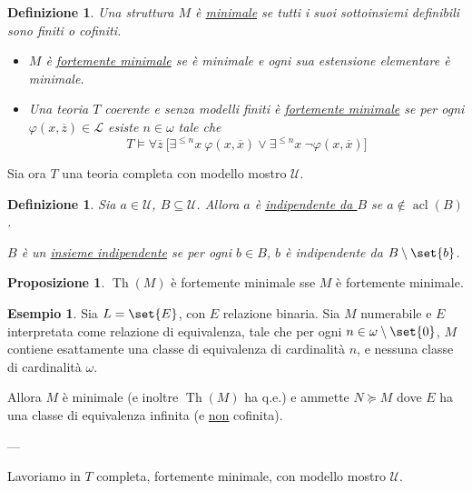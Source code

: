 \documentclass[10pt]{article}
\newcommand{\1}{\mathds{1}}
\theoremstyle{definition}%
\newtheorem{prop}[thm]{Proposizione}
\newtheorem{esempio}[thm]{Esempio}
\theoremstyle{plain}
\newtheorem{definizione}[thm]{Definizione}
\theoremstyle{remark}
\begin{document}
\begin{definizione}
Una struttura \(M\) è \uline{minimale} se tutti i suoi sottoinsiemi definibili sono finiti o cofiniti.
\begin{itemize}
\item \(M\) è \uline{fortemente minimale} se è minimale e ogni sua estensione elementare è minimale.
\item Una teoria \(T\) coerente e senza modelli finiti è \uline{fortemente minimale} se per ogni \(\varphi(x,\overline{z}) \in \mathcal{L}\) esiste \(n \in \omega\) tale che
\begin{equation*}
  T\vDash \forall \overline{z}\ \big[\exists^{\le n}x\ \varphi(x,\overline{x}) \lor\exists^{\le n}x\ \lnot\varphi(x,\overline{x})\big]
\end{equation*}
\end{itemize}
\end{definizione}

Sia ora \(T\) una teoria completa con modello mostro \(\mathcal{U}\).
\begin{definizione}
Sia \(a \in \mathcal{U}\), \(B \subseteq \mathcal{U}\). Allora \(a\) è \uline{indipendente da \(B\)} se \(a\notin \operatorname{acl}(B)\).

\(B\) è un \uline{insieme indipendente} se per ogni \(b \in B\), \(b\) è indipendente da \(B\setminus\set{b}\).
\end{definizione}


\begin{prop}
\(\operatorname{Th}(M)\) è fortemente minimale sse \(M\) è fortemente minimale.
\end{prop}
\begin{esempio}
Sia \(L=\set{E}\), con \(E\) relazione binaria. Sia \(M\) numerabile e \(E\) interpretata come relazione di equivalenza, tale che per ogni \(n \in \omega\setminus\set{0}\), \(M\) contiene esattamente una classe di equivalenza di cardinalità \(n\), e nessuna classe di cardinalità \(\omega\).

Allora \(M\) è minimale (e inoltre \(\operatorname{Th}(M)\) ha q.e.) e ammette \(N\succeq M\) dove \(E\) ha una classe di equivalenza infinita (e \uline{non} cofinita).
\end{esempio}

---

Lavoriamo in \(T\) completa, fortemente minimale, con modello mostro \(\mathcal{U}\).
\end{document}
